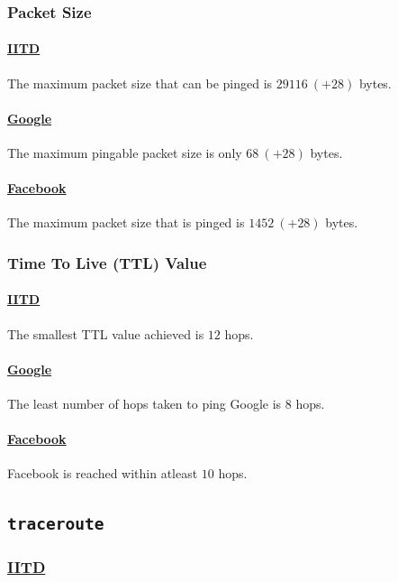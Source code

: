 \documentclass[11pt]{article}
\begin{document}
\subsubsection{Packet Size}

\paragraph{\href{https://www.iitd.ac.in}{IITD}} The maximum packet size that can be pinged is $29116\ (+28)$ bytes.
\paragraph{\href{https://www.google.com}{Google}} The maximum pingable packet size is only $68\ (+28)$ bytes.
\paragraph{\href{https://www.facebook.com}{Facebook}} The maximum packet size that is pinged is $1452\ (+28)$ bytes.

\subsubsection{Time To Live (TTL) Value}

\paragraph{\href{https://www.iitd.ac.in}{IITD}} The smallest TTL value achieved is $12$ hops.
\paragraph{\href{https://www.google.com}{Google}} The least number of hops taken to ping Google is $8$ hops.
\paragraph{\href{https://www.facebook.com}{Facebook}} Facebook is reached within atleast $10$ hops.


\subsection{\texttt{traceroute}}

\subsubsection{\href{https://www.iitd.ac.in}{IITD}}
\end{document}
